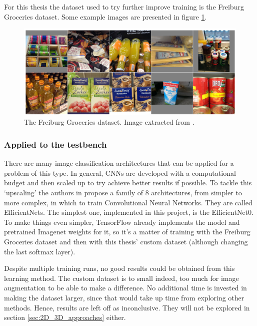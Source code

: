 \documentclass[../main.tex]{subfiles}
\begin{document}
For this thesis the dataset used to try further improve training is the Freiburg Groceries dataset. Some example images are presented in figure \ref{fig:freiburg_ds_snippet}. 

\begin{figure}[H]
    \centering
    \includegraphics[width=1\linewidth]{images/freiburg_ds_snippet.png}
    \caption{The Freiburg Groceries dataset. Image extracted from \cite{freiburg_dataset}.}
    \label{fig:freiburg_ds_snippet}
\end{figure}

\subsubsection{Applied to the testbench}
There are many image classification architectures that can be applied for a problem of this type. In general, CNNs are developed with a computational budget and then scaled up to try achieve better results if possible. To tackle this `upscaling' the authors in \cite{tan2020efficientnet} propose a family of 8 architectures, from simpler to more complex, in which to train Convolutional Neural Networks. They are called EfficientNets. The simplest one, implemented in this project, is the EfficientNet0. To make things even simpler, TensorFlow already implements the model and pretrained Imagenet weights for it, so it's a matter of training with the Freiburg Groceries dataset and then with this thesis' custom dataset (although changing the last softmax layer).

Despite multiple training runs, no good results could be obtained from this learning method. The custom dataset is to small indeed, too much for image augmentation to be able to make a difference. No additional time is invested in making the dataset larger, since that would take up time from exploring other methods. Hence, results are left off as inconclusive. They will not be explored in section \ref{sec:2D_3D_approaches} either.
\end{document}

